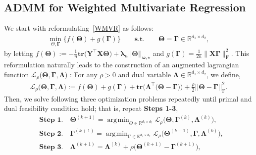 \documentclass[alpha-refs]{wiley-article}
\DeclareMathOperator*{\argmin}{\arg\!\min}
\begin{document}
\subsection{ADMM for Weighted Multivariate Regression} \label{WMVR-ADMM}
We start with reformulating~\eqref{WMVR} as follows:
\begin{align} \label{reform}
    \min_{\Theta, \boldsymbol{\Gamma}} \bigg\{ f(\boldsymbol{\Theta}) + g(\boldsymbol{\Gamma}) \bigg\}
    \qquad \textbf{s.t.} \qquad \boldsymbol{\Theta} = \boldsymbol{\Gamma} \in \mathbb{R}^{d_{1}\times d_{2}},
\end{align}
by letting $f(\boldsymbol{\Theta}):=-\frac{1}{n}\textbf{tr}\big( \boldsymbol{Y}^{\top}\boldsymbol{X}\boldsymbol{\Theta} \big)+\boldsymbol{\lambda}_{n}||\boldsymbol{\Theta}||_{\boldsymbol{\omega,\star}}$ and $g(\boldsymbol{\Gamma})=\frac{1}{2n}\|\boldsymbol{X}\boldsymbol{\Gamma}\|_{\text{F}}^{2}$.
This reformulation naturally leads to the construction of an augmented lagrangian function $\mathcal{L}_{\rho}\big(\boldsymbol{\Theta},\boldsymbol{\Gamma},\boldsymbol{\Lambda}\big)$ : For any $\rho>0$ and dual variable $\boldsymbol{\Lambda} \in \mathbb{R}^{d_{1}\times d_{2}}$, we define,
\begin{align} \label{Lagrangian}
    \mathcal{L}_{\rho}\big(\boldsymbol{\Theta},\boldsymbol{\Gamma},\boldsymbol{\Lambda}\big):=
    f(\boldsymbol{\Theta}) + g(\boldsymbol{\Gamma}) + \textbf{tr}\big( \boldsymbol{\Lambda}^{\top}\big( \boldsymbol{\Theta}-\boldsymbol{\Gamma} \big)\big)
    + \frac{\rho}{2} || \boldsymbol{\Theta}-\boldsymbol{\Gamma} ||_{\text{F}}^{2}.
\end{align}
Then, we solve following three optimization problems repeatedly until primal and dual feasibility condition hold; that is,
repeat \textbf{Steps 1-3},
\begin{align*}
    &\textbf{Step 1.} \quad \boldsymbol{\Theta}^{(k+1)} = \argmin_{\Theta \in \mathbb{R}^{d_{1} \times d_{2}}} \mathcal{L}_{\rho} \big( \boldsymbol{\Theta},\boldsymbol{\Gamma}^{(k)},\boldsymbol{\Lambda}^{(k)} \big), \\
    &\textbf{Step 2.} \quad \boldsymbol{\Gamma}^{(k+1)} = \argmin_{\boldsymbol{\Gamma} \in \mathbb{R}^{d_{1} \times d_{2}}} \mathcal{L}_{\rho} \big( \boldsymbol{\Theta}^{(k+1)},\boldsymbol{\Gamma},\boldsymbol{\Lambda}^{(k)} \big),  \\
    &\textbf{Step 3.} \quad \boldsymbol{\Lambda}^{(k+1)} = \boldsymbol{\Lambda}^{(k)} + \rho\big( \boldsymbol{\Theta}^{(k+1)}-\boldsymbol{\Gamma}^{(k+1)} \big),
\end{align*}
\end{document}
